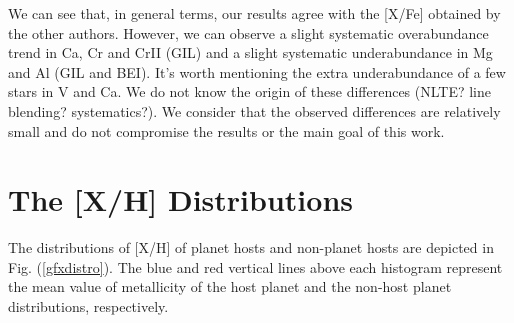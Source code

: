 \documentclass[dvips,12pt,a4paper]{report}
\begin{document}
{{We can see that, in general terms, our results agree with the [X/Fe] obtained by the other authors. However, we can observe a slight systematic overabundance trend in Ca, Cr and CrII (GIL) and a slight systematic underabundance in Mg and Al (GIL and BEI). It's worth mentioning the extra underabundance of a few stars in V and Ca. We do not know the origin of these differences (NLTE? line blending? systematics?). We consider that the observed differences are relatively small and do not compromise the results or the main goal of this work. 







\section{The [X/H] Distributions} 

The distributions of [X/H] of planet hosts and non-planet hosts are depicted in Fig. (\ref{gfxdistro}). The blue and red vertical lines above each histogram represent the mean value of metallicity of the host planet and the non-host planet distributions, respectively.

}}
\end{document}
